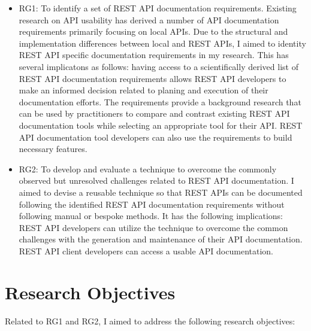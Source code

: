 \begin{itemize}
  \item RG1: To identify a set of REST API documentation requirements. Existing research on API usability has derived a number of API documentation requirements primarily focusing on local APIs. Due to the structural and implementation differences between local and REST APIs, I aimed to identity REST API specific documentation requirements in my research. This has several implicatons as follows: having access to a scientifically derived list of REST API documentation requirements allows REST API developers to make an informed decision related to planing and execution of their documentation efforts. The requirements provide a background research that can be used by practitioners to compare and contrast existing REST API documentation tools while selecting an appropriate tool for their API. REST API documentation tool developers can also use the requirements to build necessary features.
  \item RG2: To develop and evaluate a technique to overcome the commonly observed but unresolved challenges related to REST API documentation. I aimed to devise a reusable technique so that REST APIs can be documented following the identified REST API documentation requirements without following manual or bespoke methods. It has the following implications: REST API developers can utilize the technique to overcome the common challenges with the generation and maintenance of their API documentation. REST API client developers can access a usable API documentation.
\end{itemize}


\section{Research Objectives}
Related to RG1 and RG2, I aimed to address the following research objectives:

